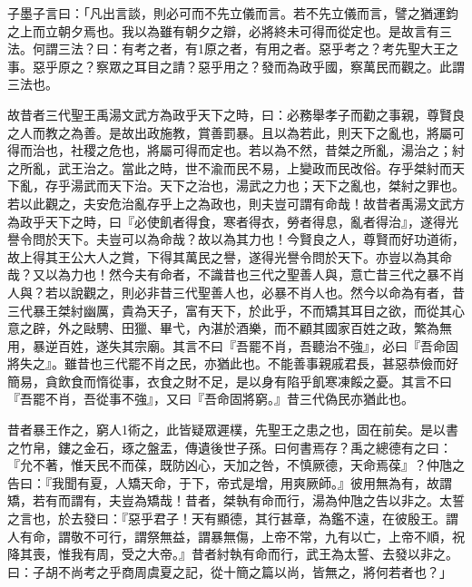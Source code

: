 
\begin{pinyinscope}
子墨子言曰：「凡出言談，則必可而不先立儀而言。若不先立儀而言，譬之猶運鈞之上而立朝夕焉也。我以為雖有朝夕之辯，必將終未可得而從定也。是故言有三法。何謂三法？曰：有考之者，有1原之者，有用之者。惡乎考之？考先聖大王之事。惡乎原之？察眾之耳目之請？惡乎用之？發而為政乎國，察萬民而觀之。此謂三法也。

故昔者三代聖王禹湯文武方為政乎天下之時，曰：必務舉孝子而勸之事親，尊賢良之人而教之為善。是故出政施教，賞善罰暴。且以為若此，則天下之亂也，將屬可得而治也，社稷之危也，將屬可得而定也。若以為不然，昔桀之所亂，湯治之；紂之所亂，武王治之。當此之時，世不渝而民不易，上變政而民改俗。存乎桀紂而天下亂，存乎湯武而天下治。天下之治也，湯武之力也；天下之亂也，桀紂之罪也。若以此觀之，夫安危治亂存乎上之為政也，則夫豈可謂有命哉！故昔者禹湯文武方為政乎天下之時，曰『必使飢者得食，寒者得衣，勞者得息，亂者得治』，遂得光譽令問於天下。夫豈可以為命哉？故以為其力也！今賢良之人，尊賢而好功道術，故上得其王公大人之賞，下得其萬民之譽，遂得光譽令問於天下。亦豈以為其命哉？又以為力也！然今夫有命者，不識昔也三代之聖善人與，意亡昔三代之暴不肖人與？若以說觀之，則必非昔三代聖善人也，必暴不肖人也。然今以命為有者，昔三代暴王桀紂幽厲，貴為天子，富有天下，於此乎，不而矯其耳目之欲，而從其心意之辟，外之敺騁、田獵、畢弋，內湛於酒樂，而不顧其國家百姓之政，繁為無用，暴逆百姓，遂失其宗廟。其言不曰『吾罷不肖，吾聽治不強』，必曰『吾命固將失之』。雖昔也三代罷不肖之民，亦猶此也。不能善事親戚君長，甚惡恭儉而好簡易，貪飲食而惰從事，衣食之財不足，是以身有陷乎飢寒凍餒之憂。其言不曰『吾罷不肖，吾從事不強』，又曰『吾命固將窮。』昔三代偽民亦猶此也。

昔者暴王作之，窮人1術之，此皆疑眾遲樸，先聖王之患之也，固在前矣。是以書之竹帛，鏤之金石，琢之盤盂，傳遺後世子孫。曰何書焉存？禹之總德有之曰：『允不著，惟天民不而葆，既防凶心，天加之咎，不慎厥德，天命焉葆』？仲虺之告曰：『我聞有夏，人矯天命，于下，帝式是增，用爽厥師。』彼用無為有，故謂矯，若有而謂有，夫豈為矯哉！昔者，桀執有命而行，湯為仲虺之告以非之。太誓之言也，於去發曰：『惡乎君子！天有顯德，其行甚章，為鑑不遠，在彼殷王。謂人有命，謂敬不可行，謂祭無益，謂暴無傷，上帝不常，九有以亡，上帝不順，祝降其喪，惟我有周，受之大帝。』昔者紂執有命而行，武王為太誓、去發以非之。曰：子胡不尚考之乎商周虞夏之記，從十簡之篇以尚，皆無之，將何若者也？」


\end{pinyinscope}
